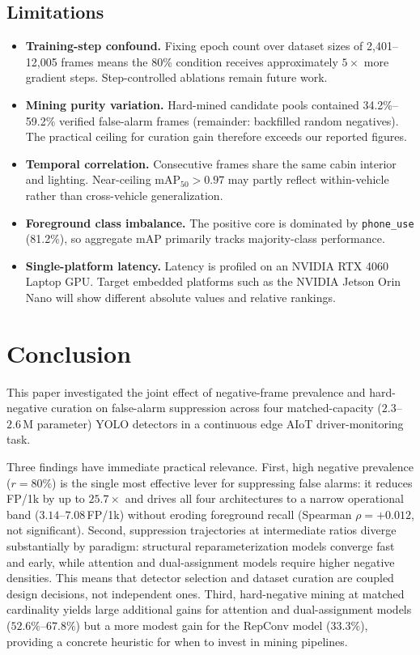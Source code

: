 \documentclass[conference]{IEEEtran}
\begin{document}
\subsection{Limitations}

\begin{itemize}\setlength{\itemsep}{0pt}
\item \textbf{Training-step confound.}
  Fixing epoch count over dataset sizes of 2,401--12,005 frames
  means the 80\% condition receives approximately $5\times$ more
  gradient steps. Step-controlled ablations remain future work.
\item \textbf{Mining purity variation.}
  Hard-mined candidate pools contained 34.2\%--59.2\% verified
  false-alarm frames (remainder: backfilled random negatives).
  The practical ceiling for curation gain therefore exceeds our
  reported figures.
\item \textbf{Temporal correlation.}
  Consecutive frames share the same cabin interior and lighting.
  Near-ceiling $\mathrm{mAP}_{50} > 0.97$ may partly reflect
  within-vehicle rather than cross-vehicle generalization.
\item \textbf{Foreground class imbalance.}
  The positive core is dominated by \texttt{phone\_use} (81.2\%),
  so aggregate mAP primarily tracks majority-class performance.
\item \textbf{Single-platform latency.}
  Latency is profiled on an NVIDIA RTX 4060 Laptop GPU. Target
  embedded platforms such as the NVIDIA Jetson Orin Nano will show
  different absolute values and relative rankings.
\end{itemize}

\section{Conclusion}
\label{sec:conclusion}

This paper investigated the joint effect of negative-frame
prevalence and hard-negative curation on false-alarm suppression
across four matched-capacity ($2.3$--$2.6$\,M parameter) YOLO
detectors in a continuous edge AIoT driver-monitoring task.

Three findings have immediate practical relevance. First, high
negative prevalence ($r{=}80\%$) is the single most effective lever
for suppressing false alarms: it reduces FP/1k by up to $25.7\times$
and drives all four architectures to a narrow operational band
($3.14$--$7.08$\,FP/1k) without eroding foreground recall (Spearman
$\rho{=}+0.012$, not significant). Second, suppression trajectories
at intermediate ratios diverge substantially by paradigm: structural
reparameterization models converge fast and early, while attention and
dual-assignment models require higher negative densities. This means
that detector selection and dataset curation are coupled design
decisions, not independent ones. Third, hard-negative mining at matched
cardinality yields large additional gains for attention and dual-assignment
models ($52.6\%$--$67.8\%$) but a more modest gain for the RepConv
model ($33.3\%$), providing a concrete heuristic for when to invest in
mining pipelines.
\end{document}
